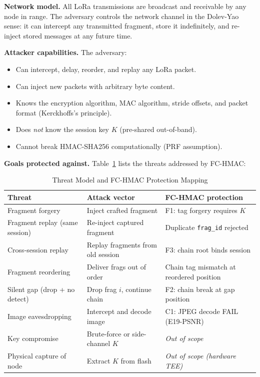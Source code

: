 \documentclass[journal]{IEEEtran}
\begin{document}
\textbf{Network model.}  All LoRa transmissions are broadcast and receivable
by any node in range.  The adversary controls the network channel in the
Dolev-Yao sense: it can intercept any transmitted fragment, store it
indefinitely, and re-inject stored messages at any future time.

\textbf{Attacker capabilities.}  The adversary:
\begin{itemize}
  \item Can intercept, delay, reorder, and replay any LoRa packet.
  \item Can inject new packets with arbitrary byte content.
  \item Knows the encryption algorithm, MAC algorithm, stride offsets,
    and packet format (Kerckhoffs's principle).
  \item Does \emph{not} know the session key $K$ (pre-shared out-of-band).
  \item Cannot break HMAC-SHA256 computationally (PRF assumption).
\end{itemize}

\textbf{Goals protected against.}
Table~\ref{tab:threats} lists the threats addressed by FC-HMAC:

\begin{table}[ht]
\centering
\caption{Threat Model and FC-HMAC Protection Mapping}
\label{tab:threats}
\begin{tabular}{p{2.4cm}p{2.0cm}p{3.0cm}}
\toprule
Threat & Attack vector & FC-HMAC protection \\
\midrule
Fragment forgery & Inject crafted fragment & F1: tag forgery requires $K$ \\
Fragment replay (same session) & Re-inject captured fragment & Duplicate \texttt{frag\_id} rejected \\
Cross-session replay & Replay fragments from old session & F3: chain root binds session \\
Fragment reordering & Deliver frags out of order & Chain tag mismatch at reordered position \\
Silent gap (drop + no detect) & Drop frag $i$, continue chain & F2: chain break at gap position \\
Image eavesdropping & Intercept and decode image & C1: JPEG decode FAIL (E19-PSNR) \\
\midrule
Key compromise & Brute-force or side-channel $K$ & \emph{Out of scope} \\
Physical capture of node & Extract $K$ from flash & \emph{Out of scope (hardware TEE)} \\
\bottomrule
\end{tabular}
\end{table}
\end{document}
